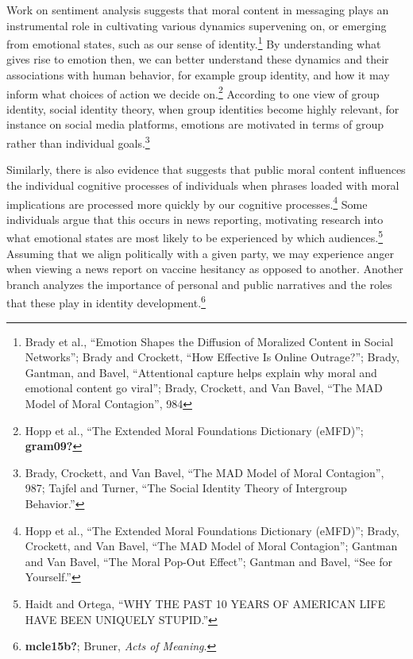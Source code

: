 \documentclass[
  12pt,
]{book}
\theoremstyle{definition}
\theoremstyle{definition}
\theoremstyle{definition}
\theoremstyle{definition}
\theoremstyle{remark}
\begin{document}
Work on sentiment analysis suggests that moral content in messaging plays an instrumental role in cultivating various dynamics supervening on, or emerging from emotional states, such as our sense of identity.\footnote{Brady et al., {``Emotion Shapes the Diffusion of Moralized Content in Social Networks''}; Brady and Crockett, {``How Effective Is Online Outrage?''}; Brady, Gantman, and Bavel, {``Attentional capture helps explain why moral and emotional content go viral''}; Brady, Crockett, and Van Bavel, {``The {MAD} Model of Moral Contagion''}, 984} By understanding what gives rise to emotion then, we can better understand these dynamics and their associations with human behavior, for example group identity, and how it may inform what choices of action we decide on.\footnote{Hopp et al., {``The Extended {Moral Foundations Dictionary} ({eMFD})''}; \textbf{gram09?}} According to one view of group identity, social identity theory, when group identities become highly relevant, for instance on social media platforms, emotions are motivated in terms of group rather than individual goals.\footnote{Brady, Crockett, and Van Bavel, {``The {MAD} Model of Moral Contagion''}, 987; Tajfel and Turner, {``The {Social Identity Theory} of {Intergroup Behavior}.''}}

Similarly, there is also evidence that suggests that public moral content influences the individual cognitive processes of individuals when phrases loaded with moral implications are processed more quickly by our cognitive processes.\footnote{Hopp et al., {``The Extended {Moral Foundations Dictionary} ({eMFD})''}; Brady, Crockett, and Van Bavel, {``The {MAD} Model of Moral Contagion''}; Gantman and Van Bavel, {``The Moral Pop-Out Effect''}; Gantman and Bavel, {``See for Yourself.''}} Some individuals argue that this occurs in news reporting, motivating research into what emotional states are most likely to be experienced by which audiences.\footnote{Haidt and Ortega, {``{WHY THE PAST} 10 {YEARS OF AMERICAN LIFE HAVE BEEN UNIQUELY STUPID}.''}} Assuming that we align politically with a given party, we may experience anger when viewing a news report on vaccine hesitancy as opposed to another. Another branch analyzes the importance of personal and public narratives and the roles that these play in identity development.\footnote{\textbf{mcle15b?}; Bruner, \emph{Acts of Meaning}.}
\end{document}
